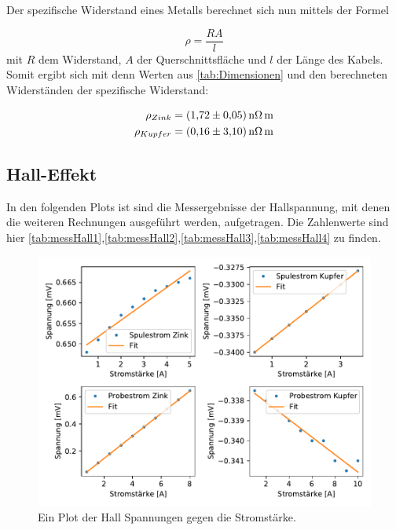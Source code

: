     Der spezifische Widerstand eines Metalls berechnet sich nun mittels der Formel

    \begin{equation}
        \rho = \frac{RA}{l}
    \end{equation}
    \noindent
    mit $R$ dem Widerstand, $A$ der Querschnittsfläche und $l$ der Länge des Kabels.
    Somit ergibt sich mit denn Werten aus \ref{tab:Dimensionen} und den berechneten Widerständen der spezifische Widerstand:

    \begin{align}
        \rho_{Zink} &= \SI{1.72+-0.05}{\nano\ohm\meter}\\
        \rho_{Kupfer} &= \SI{0.16+-03.1}{\nano\ohm\meter}
    \end{align}


    \subsection{Hall-Effekt}


    In den folgenden Plots ist sind die Messergebnisse der Hallspannung, mit denen die weiteren Rechnungen ausgeführt werden, 
    aufgetragen. Die Zahlenwerte sind hier \ref{tab:messHall1},\ref{tab:messHall2},\ref{tab:messHall3},\ref{tab:messHall4} zu finden.
    

    \begin{figure}[H]
        \centering
        \includegraphics[width=1.1\textwidth]{build/Hall.pdf}
        \caption{Ein Plot der Hall Spannungen gegen die Stromstärke.}
        \label{img:messHall}
    \end{figure}
    
